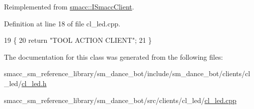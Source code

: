 Reimplemented from \hyperlink{classsmacc_1_1ISmaccClient_a20846aabfd1de832aa27d7a8237a1742}{smacc\+::\+I\+Smacc\+Client}.



Definition at line 18 of file cl\+\_\+led.\+cpp.


\begin{DoxyCode}
19 \{
20     \textcolor{keywordflow}{return} \textcolor{stringliteral}{"TOOL ACTION CLIENT"};
21 \}
\end{DoxyCode}


The documentation for this class was generated from the following files\+:\begin{DoxyCompactItemize}
\item 
smacc\+\_\+sm\+\_\+reference\+\_\+library/sm\+\_\+dance\+\_\+bot/include/sm\+\_\+dance\+\_\+bot/clients/cl\+\_\+led/\hyperlink{include_2sm__dance__bot_2clients_2cl__led_2cl__led_8h}{cl\+\_\+led.\+h}\item 
smacc\+\_\+sm\+\_\+reference\+\_\+library/sm\+\_\+dance\+\_\+bot/src/clients/cl\+\_\+led/\hyperlink{src_2clients_2cl__led_2cl__led_8cpp}{cl\+\_\+led.\+cpp}\end{DoxyCompactItemize}
